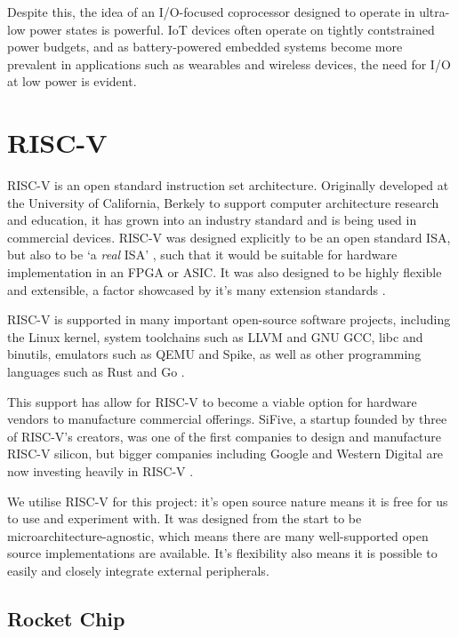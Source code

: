 Despite this, the idea of an I/O-focused coprocessor designed to operate in ultra-low power states is powerful. IoT devices often operate on tightly contstrained power budgets, and as battery-powered embedded systems become more prevalent in applications such as wearables and wireless devices, the need for I/O at low power is evident.

\section{RISC-V}

RISC-V is an open standard instruction set architecture. Originally developed at the University of California, Berkely to support computer architecture research and education, it has grown into an industry standard and is being used in commercial devices. RISC-V was designed explicitly to be an open standard ISA, but also to be `a \textit{real} ISA' \cite{riscv_design}, such that it would be suitable for hardware implementation in an FPGA or ASIC. It was also designed to be highly flexible and extensible, a factor showcased by it's many extension standards \cite{riscv_spec}.

RISC-V is supported in many important open-source software projects, including the Linux kernel, system toolchains such as LLVM and GNU GCC, libc and binutils, emulators such as QEMU and Spike, as well as other programming languages such as Rust and Go \cite{riscv_wiki}.

This support has allow for RISC-V to become a viable option for hardware vendors to manufacture commercial offerings. SiFive, a startup founded by three of RISC-V's creators, was one of the first companies to design and manufacture RISC-V silicon, but bigger companies including Google and Western Digital are now investing heavily in RISC-V \cite{riscv_article}.

We utilise RISC-V for this project: it's open source nature means it is free for us to use and experiment with. It was designed from the start to be microarchitecture-agnostic, which means there are many well-supported open source implementations are available. It's flexibility also means it is possible to easily and closely integrate external peripherals.


\subsection{Rocket Chip}

